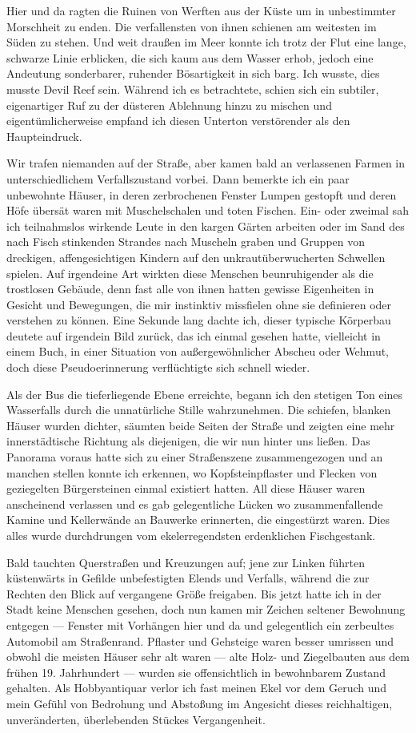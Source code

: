 Hier und da ragten die Ruinen von Werften aus der Küste um in unbestimmter Morschheit zu enden. Die verfallensten von ihnen schienen am weitesten im Süden zu stehen. Und weit draußen im Meer konnte ich trotz der Flut eine lange, schwarze Linie erblicken, die sich kaum aus dem Wasser erhob, jedoch eine Andeutung sonderbarer, ruhender Bösartigkeit in sich barg. Ich wusste, dies musste Devil Reef sein. Während ich es betrachtete, schien sich ein subtiler, eigenartiger Ruf zu der düsteren Ablehnung hinzu zu mischen und eigentümlicherweise empfand ich diesen Unterton verstörender als den Haupteindruck.

Wir trafen niemanden auf der Straße, aber kamen bald an verlassenen Farmen in unterschiedlichem Verfallszustand vorbei. Dann bemerkte ich ein paar unbewohnte Häuser, in deren zerbrochenen Fenster Lumpen gestopft und deren Höfe übersät waren mit Muschelschalen und toten Fischen. Ein- oder zweimal sah ich teilnahmslos wirkende Leute in den kargen Gärten arbeiten oder im Sand des nach Fisch stinkenden Strandes nach Muscheln graben und Gruppen von dreckigen, affengesichtigen Kindern auf den unkrautüberwucherten Schwellen spielen. Auf irgendeine Art wirkten diese Menschen beunruhigender als die trostlosen Gebäude, denn fast alle von ihnen hatten gewisse Eigenheiten in Gesicht und Bewegungen, die mir instinktiv missfielen ohne sie definieren oder verstehen zu können.  Eine Sekunde lang dachte ich, dieser typische Körperbau deutete auf irgendein Bild zurück, das ich einmal gesehen hatte, vielleicht in einem Buch, in einer Situation von außergewöhnlicher Abscheu oder Wehmut, doch diese Pseudoerinnerung verflüchtigte sich schnell wieder.

Als der Bus die tieferliegende Ebene erreichte, begann ich den stetigen Ton eines Wasserfalls durch die unnatürliche Stille wahrzunehmen. Die schiefen, blanken Häuser wurden dichter, säumten beide Seiten der Straße und zeigten eine mehr innerstädtische Richtung als diejenigen, die wir nun hinter uns ließen. Das Panorama voraus hatte sich zu einer Straßenszene zusammengezogen und an manchen stellen konnte ich erkennen, wo Kopfsteinpflaster und Flecken von geziegelten Bürgersteinen einmal existiert hatten. All diese Häuser waren anscheinend verlassen und es gab gelegentliche Lücken wo zusammenfallende Kamine und Kellerwände an Bauwerke erinnerten, die eingestürzt waren. Dies alles wurde durchdrungen vom ekelerregendsten erdenklichen Fischgestank.

Bald tauchten Querstraßen und Kreuzungen auf; jene zur Linken führten küstenwärts in Gefilde unbefestigten Elends und Verfalls, während die zur Rechten den Blick auf vergangene Größe freigaben. Bis jetzt hatte ich in der Stadt keine Menschen gesehen, doch nun kamen mir Zeichen seltener Bewohnung entgegen --- Fenster mit Vorhängen hier und da und gelegentlich ein zerbeultes Automobil am Straßenrand. Pflaster und Gehsteige waren besser umrissen und obwohl die meisten Häuser sehr alt waren --- alte Holz- und Ziegelbauten aus dem frühen 19. Jahrhundert --- wurden sie offensichtlich in bewohnbarem Zustand gehalten. Als Hobbyantiquar verlor ich fast meinen Ekel vor dem Geruch und mein Gefühl von Bedrohung und Abstoßung im Angesicht dieses reichhaltigen, unveränderten, überlebenden Stückes Vergangenheit.

